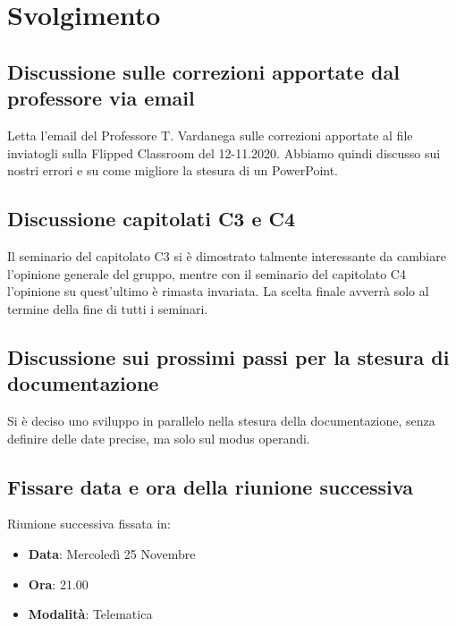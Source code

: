 \documentclass[]{article}
\begin{document}
\newpage

\section{Svolgimento}
\subsection{Discussione sulle correzioni apportate dal professore via email}
Letta l'email del Professore T. Vardanega sulle correzioni apportate al file inviatogli sulla Flipped Classroom del 12-11.2020.
Abbiamo quindi discusso sui nostri errori e su come migliore la stesura di un PowerPoint.\\

\subsection{Discussione capitolati C3 e C4}
Il seminario del capitolato C3 si è dimostrato talmente interessante da cambiare l'opinione generale del gruppo, mentre con il seminario del capitolato C4 l'opinione su quest'ultimo è rimasta invariata. La scelta finale avverrà solo al termine della fine di tutti i seminari.\\

\subsection{Discussione sui prossimi passi per la stesura di documentazione}
Si è deciso uno sviluppo in parallelo nella stesura della documentazione, senza definire delle date precise, ma solo sul modus operandi.

\subsection{Fissare data e ora della riunione successiva}
Riunione successiva fissata in:
\begin{itemize}
	\item \textbf{Data}: Mercoledì 25 Novembre
	\item \textbf{Ora}: 21.00
	\item \textbf{Modalità}: Telematica
\end{itemize}


	
\end{document}
